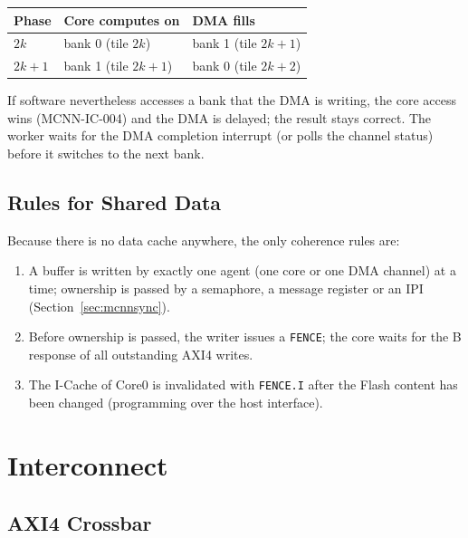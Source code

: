 \begin{center}
{\footnotesize
\begin{tabular}{|l |l |l|}
  \hline
  Phase & Core computes on & DMA fills \\
  \hline
  $2k$   & bank 0 (tile $2k$)   & bank 1 (tile $2k{+}1$) \\
  \hline
  $2k{+}1$ & bank 1 (tile $2k{+}1$) & bank 0 (tile $2k{+}2$) \\
  \hline
\end{tabular}}
\end{center}

If software nevertheless accesses a bank that the DMA is writing, the core
access wins (MCNN-IC-004) and the DMA is delayed; the result stays correct.
The worker waits for the DMA completion interrupt (or polls the channel
status) before it switches to the next bank.

\subsection{Rules for Shared Data}
\label{subsec:mcnnshared}

Because there is no data cache anywhere, the only coherence rules are:
\begin{enumerate}
  \item A buffer is written by exactly one agent (one core or one DMA channel)
    at a time; ownership is passed by a semaphore, a message register or an
    IPI (Section~\ref{sec:mcnnsync}).
  \item Before ownership is passed, the writer issues a \texttt{FENCE}; the
    core waits for the B response of all outstanding AXI4 writes.
  \item The I-Cache of Core0 is invalidated with \texttt{FENCE.I} after the
    Flash content has been changed (programming over the host interface).
\end{enumerate}

\section{Interconnect}
\label{sec:mcnnic}

\subsection{AXI4 Crossbar}
\label{subsec:mcnnxbar}

